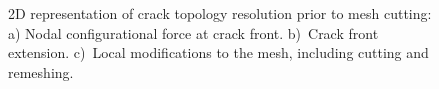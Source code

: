 \documentclass[onecolumn]{svjour3}
\begin{document}
% 
\begin{figure}
	\centering

		\caption{2D representation of crack topology resolution prior to mesh cutting: a) Nodal configurational force at crack front. b)~Crack front extension. c)~Local modifications to the mesh, including cutting and remeshing.}
		\label{fig:crack_procedure}
\end{figure}
\end{document}
